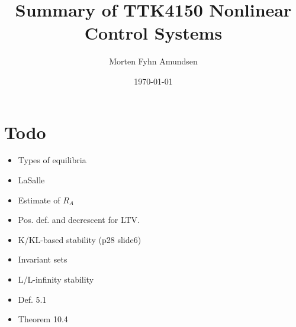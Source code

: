 \documentclass[a4paper]{article}
\title{Summary of TTK4150 Nonlinear Control Systems}
\author{Morten Fyhn Amundsen}
\date{\today}
\begin{document}
\maketitle
\tableofcontents

\section{Todo}
\begin{itemize}
	\item Types of equilibria
	\item LaSalle
	\item Estimate of $R_A$
	\item Pos. def. and decrescent for LTV.
	\item K/KL-based stability (p28 slide6)
	\item Invariant sets
	\item L/L-infinity stability
	\item Def. 5.1
	\item Theorem 10.4
\end{itemize}




\end{document}
